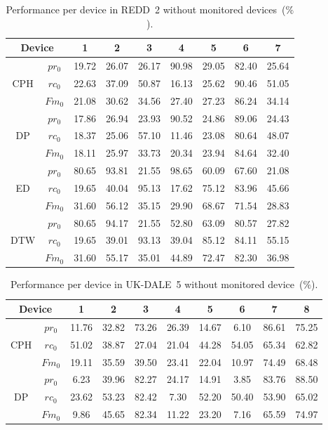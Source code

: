 \begin{table}
\caption{Performance per device in REDD~2 without monitored devices~($\%$).}\label{table:SR6b}
\begin{center}
\begin{tabular}{|c|c|c|c|c|c|c|c|c|}
\hline
\multicolumn{2}{|c|}{Device}& 1&2&3&4&5&6&7\\
\hline
\multirow{3}{*}{CPH} & $pr_0$ & 19.72&26.07&26.17&90.98&29.05&82.40&25.64\\
& $rc_0$ & 22.63&37.09&50.87&16.13&25.62&90.46&51.05  \\
& $Fm_0$ & 21.08&30.62&34.56&27.40&27.23&86.24&34.14 \\
\hline
\multirow{3}{*}{DP} & $pr_0$ & 17.86&26.94&23.93&90.52&24.86&89.06&24.43 \\
& $rc_0$ & 18.37 & 25.06&57.10&11.46 &23.08 & 80.64&48.07  \\
& $Fm_0$ & 18.11&25.97& 33.73&20.34&23.94&84.64&32.40 \\
\hline
\multirow{3}{*}{ED} & $pr_0$ &80.65&93.81&21.55&98.65&60.09&67.60&21.08 \\
& $rc_0$ & 19.65&40.04&95.13&17.62&75.12&83.96&45.66 \\
& $Fm_0$ & 31.60&56.12&35.15&29.90&68.67&71.54&28.83 \\
\hline
\multirow{3}{*}{DTW} & $pr_0$ & 80.65&94.17 &21.55 &52.80 &63.09 &80.57 &27.82 \\
& $rc_0$ &19.65 &39.01 &93.13 &39.04 &85.12 &84.11 &55.15  \\
& $Fm_0$ &31.60 &55.17 &35.01 &44.89 &72.47 &82.30 &36.98  \\
\hline
\end{tabular}
\end{center}
\end{table}


\begin{table}
\caption{Performance per device in UK-DALE~5 without monitored device~($\%$).}\label{table:SR6c}
\begin{center}
\begin{tabular}{|c|c|c|c|c|c|c|c|c|c|}
\hline
\multicolumn{2}{|c|}{Device}& 1&2&3&4&5&6&7&8\\
\hline
\multirow{3}{*}{CPH} & $pr_0$ &11.76&32.82&73.26&26.39&14.67&6.10&86.61&75.25 \\
& $rc_0$ &51.02&38.87&27.04&21.04&44.28&54.05&65.34&62.82  \\
& $Fm_0$ &19.11&35.59&39.50&23.41&22.04&10.97&74.49&68.48 \\
\hline
\multirow{3}{*}{DP} & $pr_0$ &6.23 &39.96 &82.27 &24.17 &14.91 &3.85 &83.76 &88.50 \\
& $rc_0$ &23.62 &53.23 &82.42 &7.30 &52.20 &50.40 &53.90 &65.02  \\
& $Fm_0$ &9.86 &45.65 &82.34 &11.22 &23.20 &7.16 &65.59 &74.97 \\
\hline
\end{tabular}
\end{center}
\end{table}

